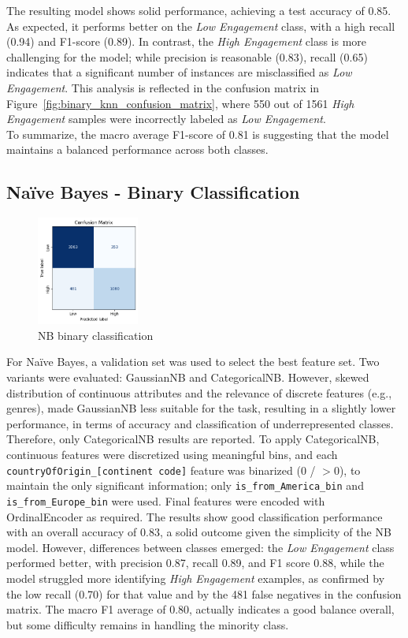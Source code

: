 The resulting model shows solid performance, achieving a test accuracy of 0.85. As expected, it performs better on the \textit{Low Engagement} class, with a high recall (0.94) and F1-score (0.89). 
In contrast, the \textit{High Engagement} class is more challenging for the model; while precision is reasonable (0.83), recall (0.65) indicates that a significant number of instances are misclassified as 
\textit{Low Engagement}.
This analysis is reflected in the confusion matrix in Figure~\ref{fig:binary_knn_confusion_matrix}, where 550 out of 1561 \textit{High Engagement} samples were incorrectly labeled as \textit{Low Engagement}.\\

To summarize, the macro average F1-score of 0.81 is suggesting that the model maintains a balanced performance across both classes.



\subsection{Naïve Bayes - Binary Classification}

\begin{figure}
    \centering
    \includegraphics[width=0.30\textwidth]{plots/nb_binary_confmatrix.png}
    \caption{NB binary classification}
    \label{fig:nb_binary}
\end{figure}
For Naïve Bayes, a validation set was used to select the best feature set. Two variants were evaluated: GaussianNB and CategoricalNB. 
However, skewed distribution of continuous attributes and the relevance of discrete features (e.g., genres), made GaussianNB less suitable 
for the task, resulting in a slightly lower performance, in terms of accuracy and classification of underrepresented classes. 
Therefore, only CategoricalNB results are reported. 
To apply CategoricalNB, continuous features were discretized using meaningful bins, and each \texttt{countryOfOrigin\_[continent code]} feature was binarized (0 / $>$0), to maintain the only significant information; 
only \texttt{is\_from\_America\_bin} and \texttt{is\_from\_Europe\_bin} were used. Final features were encoded with OrdinalEncoder as required.
The results show good classification performance with an overall accuracy of 0.83, a solid outcome given the simplicity of the NB model.
However, differences between classes emerged: the \textit{Low Engagement} class performed better, with precision 0.87, recall 0.89, and F1 score 0.88, 
while the model struggled more identifying  \textit{High Engagement} examples, as confirmed by the low recall (0.70) for that value and by the 481 false 
negatives in the confusion matrix. The macro F1 average of 0.80, actually indicates a good balance overall, but some difficulty remains in handling the minority class.


